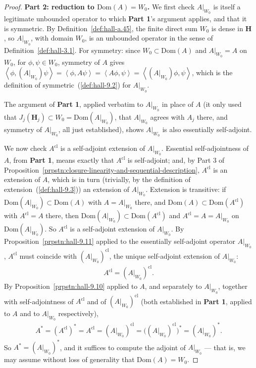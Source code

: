 \begin{proof}
\textbf{Part 2: reduction to $\text{Dom}(A) = W_0$.} We first check $A\vert_{W_0}$ is itself a legitimate unbounded operator to which \textbf{Part 1}'s argument applies, and that it is symmetric. By Definition~\ref{def:hall-a.45}, the finite direct sum $W_0$ is dense in $\mathbf{H}$, so $A\vert_{W_0}$, with domain $W_0$, is an unbounded operator in the sense of Definition~\ref{def:hall-3.1}. For symmetry: since $W_0 \subset \text{Dom}(A)$ and $A\vert_{W_0} = A$ on $W_0$, for $\phi,\psi \in W_0$, symmetry of $A$ gives $\left< \phi, (A\vert_{W_0})\psi \right> = \left< \phi, A\psi \right> = \left< A\phi, \psi \right> = \left< (A\vert_{W_0})\phi, \psi \right>$, which is the definition of symmetric~(\ref{def:hall-9.2}) for $A\vert_{W_0}$.

The argument of \textbf{Part 1}, applied verbatim to $A\vert_{W_0}$ in place of $A$ (it only used that $J_j(\mathbf{H}_j) \subset W_0 = \text{Dom}(A\vert_{W_0})$, that $A\vert_{W_0}$ agrees with $A_j$ there, and symmetry of $A\vert_{W_0}$, all just established), shows $A\vert_{W_0}$ is also essentially self-adjoint.

We now check $A^{\text{cl}}$ is a self-adjoint extension of $A\vert_{W_0}$. Essential self-adjointness of $A$, from \textbf{Part 1}, means exactly that $A^{\text{cl}}$ is self-adjoint; and, by Part 3 of Proposition~\ref{prpstn:closure-linearity-and-sequential-description}, $A^{\text{cl}}$ is an extension of $A$, which is in turn (trivially, by the definition of extension~(\ref{def:hall-9.3})) an extension of $A\vert_{W_0}$. Extension is transitive: if $\text{Dom}(A\vert_{W_0}) \subset \text{Dom}(A)$ with $A = A\vert_{W_0}$ there, and $\text{Dom}(A) \subset \text{Dom}(A^{\text{cl}})$ with $A^{\text{cl}} = A$ there, then $\text{Dom}(A\vert_{W_0}) \subset \text{Dom}(A^{\text{cl}})$ and $A^{\text{cl}} = A = A\vert_{W_0}$ on $\text{Dom}(A\vert_{W_0})$. So $A^{\text{cl}}$ is a self-adjoint extension of $A\vert_{W_0}$. By Proposition~\ref{prpstn:hall-9.11} applied to the essentially self-adjoint operator $A\vert_{W_0}$, $A^{\text{cl}}$ must coincide with $(A\vert_{W_0})^{\text{cl}}$, the unique self-adjoint extension of $A\vert_{W_0}$:
\begin{align}
    A^{\text{cl}} = (A\vert_{W_0})^{\text{cl}}.
\end{align}
By Proposition~\ref{prpstn:hall-9.10} applied to $A$, and separately to $A\vert_{W_0}$, together with self-adjointness of $A^{\text{cl}}$ and of $(A\vert_{W_0})^{\text{cl}}$ (both established in \textbf{Part 1}, applied to $A$ and to $A\vert_{W_0}$ respectively),
\begin{align}
    A^* = (A^{\text{cl}})^* = A^{\text{cl}} = (A\vert_{W_0})^{\text{cl}} = \big( (A\vert_{W_0})^{\text{cl}} \big)^* = (A\vert_{W_0})^*.
\end{align}
So $A^* = (A\vert_{W_0})^*$, and it suffices to compute the adjoint of $A\vert_{W_0}$ — that is, we may assume without loss of generality that $\text{Dom}(A) = W_0$.


\end{proof}
